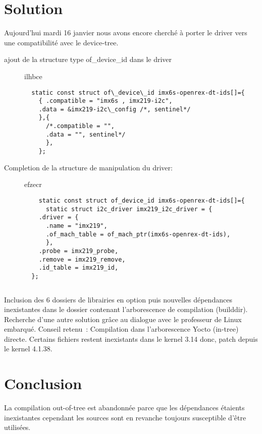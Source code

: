\section{Solution}
Aujourd'hui mardi 16 janvier nous avons encore cherché à porter le driver vers
une compatibilité avec le device-tree.
\begin{description}
  \item[ajout de la structure type of\_device\_id dans le driver ] ilhbce
  \begin{lstlisting}
  static const struct of\_device\_id imx6s-openrex-dt-ids[]={
    { .compatible = "imx6s , imx219-i2c",
    .data = &imx219-i2c\_config /*, sentinel*/
    },{
      /*.compatible = "",
      .data = "", sentinel*/
      },
    };
    \end{lstlisting}
    \item[Completion de la structure de manipulation du driver:] efzecr
    \begin{lstlisting}
    static const struct of_device_id imx6s-openrex-dt-ids[]={
      static struct i2c_driver imx219_i2c_driver = {
    .driver = {
      .name = "imx219",
      .of_mach_table = of_mach_ptr(imx6s-openrex-dt-ids),
      },
  	.probe = imx219_probe,
    .remove = imx219_remove,
    .id_table = imx219_id,
  };
      \end{lstlisting}
    \end{description}

    \begin{lstlisting}

    \end{lstlisting}

    \clearpage

    Inclusion des 6 dossiers de librairies en option puis nouvelles dépendances
    inexistantes dans le dossier contenant l’arborescence de compilation (builddir).
    Recherche d’une autre solution grâce au dialogue avec le professeur de Linux
    embarqué. Conseil retenu : Compilation dans l’arborescence Yocto (in-tree)
    directe. Certains fichiers restent inexistants dans le kernel 3.14 donc,
    patch depuis le kernel 4.1.38.

    \section{Conclusion}

    La compilation out-of-tree est abandonnée parce que les dépendances étaients
    inexistantes cependant les sources sont en revanche toujours susceptible d’être utilisées.
